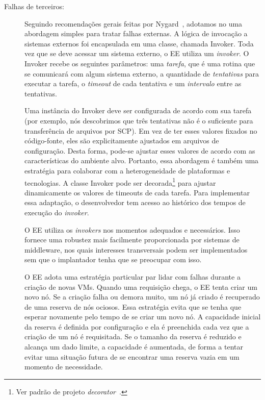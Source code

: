 \begin{description}
\item [Falhas de terceiros:]

Seguindo recomendações gerais feitas por Nygard~\cite{Nygard2009Release},
adotamos no \ee uma abordagem simples para tratar falhas externas.
A lógica de invocação a sistemas externos foi encapsulada em uma classe, 
chamada \textsf{Invoker}.
Toda vez que se deve acessar um sistema externo, o EE utiliza um \emph{invoker}.
O \textsf{Invoker} recebe os seguintes parâmetros:
uma \emph{tarefa}, que é uma rotina que se comunicará com algum sistema externo,
a quantidade de \emph{tentativas} para executar a tarefa,
o \emph{timeout} de cada tentativa e um \emph{intervalo} entre as tentativas.

Uma instância do \textsf{Invoker} deve ser configurada 
de acordo com sua tarefa (por exemplo, nós descobrimos que três tentativas
não é o suficiente para transferência de arquivos por SCP).
Em vez de ter esses valores fixados no código-fonte, eles são explicitamente
ajustados em arquivos de configuração.
Desta forma, pode-se ajustar esses valores de acordo com 
as características do ambiente alvo.
Portanto, essa abordagem é também uma estratégia para colaborar 
com a heterogeneidade de plataformas e tecnologias.
A classe \textsf{Invoker} pode ser decorada\footnote{Ver padrão de projeto \emph{decorator}~\cite{GoF1995Patterns}.} 
para ajustar dinamicamente os valores de timeouts de cada tarefa.
Para implementar essa adaptação, o desenvolvedor tem acesso
ao histórico dos tempos de execução do \emph{invoker}.

O EE utiliza os \emph{invokers} nos momentos adequados e necessários.
Isso fornece uma robustez mais facilmente proporcionada por sistemas de middleware,
nos quais interesses transversais podem ser implementados sem que o implantador 
tenha que se preocupar com isso.

O EE adota uma estratégia particular par lidar com falhas durante a criação de novas VMs.
Quando uma requisição chega, o EE tenta criar um novo nó.
Se a criação falha ou demora muito, um nó já criado é recuperado de uma reserva de nós ociosos.
Essa estratégia evita que se tenha que esperar novamente pelo tempo de se criar um novo nó.
A capacidade inicial da reserva é definida por configuração
e ela é preenchida cada vez que a criação de um nó é requisitada.
Se o tamanho da reserva é reduzido e alcança um dado limite,
a capacidade é aumentada, de forma a tentar evitar uma situação futura
de se encontrar uma reserva vazia em um momento de necessidade.


\end{description}
